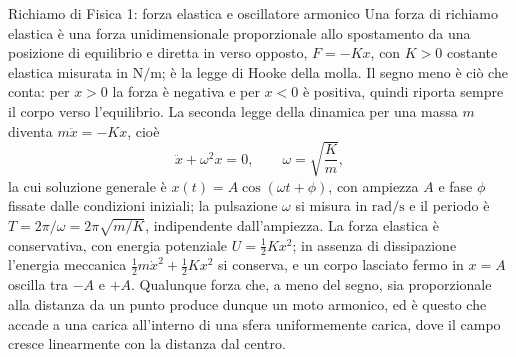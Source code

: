 \documentclass[11pt,a4paper]{article}
\begin{document}
\begin{riquadro}[label=ric:gauss:oscillatore]{Richiamo di Fisica 1: forza elastica e oscillatore armonico}
Una forza di richiamo elastica è una forza unidimensionale proporzionale allo spostamento da una posizione di equilibrio e diretta in verso opposto, $F=-Kx$, con $K>0$ costante elastica misurata in $\mathrm{N/m}$; è la legge di Hooke della molla. Il segno meno è ciò che conta: per $x>0$ la forza è negativa e per $x<0$ è positiva, quindi riporta sempre il corpo verso l'equilibrio. La seconda legge della dinamica per una massa $m$ diventa $m\ddot{x}=-Kx$, cioè
\[
\ddot{x}+\omega^2x=0,\qquad \omega=\sqrt{\frac{K}{m}},
\]
la cui soluzione generale è $x(t)=A\cos(\omega t+\phi)$, con ampiezza $A$ e fase $\phi$ fissate dalle condizioni iniziali; la pulsazione $\omega$ si misura in $\mathrm{rad/s}$ e il periodo è $T=2\pi/\omega=2\pi\sqrt{m/K}$, indipendente dall'ampiezza. La forza elastica è conservativa, con energia potenziale $U=\tfrac12Kx^2$; in assenza di dissipazione l'energia meccanica $\tfrac12m\dot{x}^2+\tfrac12Kx^2$ si conserva, e un corpo lasciato fermo in $x=A$ oscilla tra $-A$ e $+A$. Qualunque forza che, a meno del segno, sia proporzionale alla distanza da un punto produce dunque un moto armonico, ed è questo che accade a una carica all'interno di una sfera uniformemente carica, dove il campo cresce linearmente con la distanza dal centro.
\end{riquadro}
\end{document}
